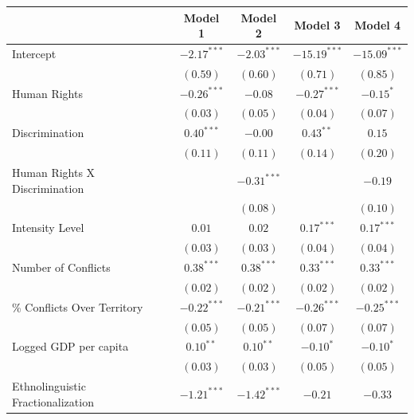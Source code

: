 \documentclass[12pt,]{book}
\let\origtable\table
\let\endorigtable\endtable
\renewenvironment{table}[1][2] {
    \singlespacing
    \expandafter\origtable\expandafter[H]
} {
    \endorigtable
}
\begin{document}
\begin{table}
\begin{center}
\begin{tabular}{l c c c c }
\hline
 & Model 1 & Model 2 & Model 3 & Model 4 \\
\hline
Intercept                         & $-2.17^{***}$ & $-2.03^{***}$ & $-15.19^{***}$ & $-15.09^{***}$ \\
                                  & $(0.59)$      & $(0.60)$      & $(0.71)$       & $(0.85)$       \\
Human Rights                      & $-0.26^{***}$ & $-0.08$       & $-0.27^{***}$  & $-0.15^{*}$    \\
                                  & $(0.03)$      & $(0.05)$      & $(0.04)$       & $(0.07)$       \\
Discrimination                    & $0.40^{***}$  & $-0.00$       & $0.43^{**}$    & $0.15$         \\
                                  & $(0.11)$      & $(0.11)$      & $(0.14)$       & $(0.20)$       \\
Human Rights X Discrimination     &               & $-0.31^{***}$ &                & $-0.19$        \\
                                  &               & $(0.08)$      &                & $(0.10)$       \\
Intensity Level                   & $0.01$        & $0.02$        & $0.17^{***}$   & $0.17^{***}$   \\
                                  & $(0.03)$      & $(0.03)$      & $(0.04)$       & $(0.04)$       \\
Number of Conflicts               & $0.38^{***}$  & $0.38^{***}$  & $0.33^{***}$   & $0.33^{***}$   \\
                                  & $(0.02)$      & $(0.02)$      & $(0.02)$       & $(0.02)$       \\
\% Conflicts Over Territory       & $-0.22^{***}$ & $-0.21^{***}$ & $-0.26^{***}$  & $-0.25^{***}$  \\
                                  & $(0.05)$      & $(0.05)$      & $(0.07)$       & $(0.07)$       \\
Logged GDP per capita             & $0.10^{**}$   & $0.10^{**}$   & $-0.10^{*}$    & $-0.10^{*}$    \\
                                  & $(0.03)$      & $(0.03)$      & $(0.05)$       & $(0.05)$       \\
Ethnolinguistic Fractionalization & $-1.21^{***}$ & $-1.42^{***}$ & $-0.21$        & $-0.33$        \\

\end{tabular}
\end{center}
\end{table}
\end{document}
